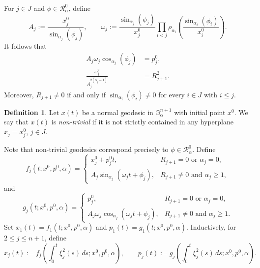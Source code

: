 \documentclass[12pt]{amsart}
\numberwithin{equation}{section}
\theoremstyle{plain}
\theoremstyle{definition}
\newtheorem{definition}[theorem]{Definition}%
\theoremstyle{remark}
\begin{document}
For \(j\in J\) and \(\phi\in\mathcal R_\alpha^0\), define
\begin{equation}\label{e.AandOmega}
    A_j
    :=
    \frac{x_j^0}{\sin_{\alpha_j}(\phi_j)},
    \qquad
    \omega_j
    :=
    \frac{\sin_{\alpha_j}(\phi_j)}{x_j^0}
    \prod_{i<j}
    \rho_{\alpha_i}
    \left(
    \frac{\sin_{\alpha_i}(\phi_i)}{x_i^0}
    \right).
\end{equation}
It follows that
\begin{align}
    A_j\omega_j\cos_{\alpha_j}(\phi_j)
     & =
    p_j^0,
    \label{properties}
    \\
    \frac{\omega_j^2}{A_j^{2(\alpha_j-1)}}
     & =
    R_{j+1}^2.
    \label{properties 2}
\end{align}
Moreover, \(R_{j+1}\neq 0\) if and only if
\(\sin_{\alpha_i}(\phi_i)\neq 0\) for every \(i\in J\) with \(i\leq j\).
\begin{definition}
    Let \(x(t)\) be a normal geodesic in \(\mathbb G_\alpha^{n+1}\) with initial point
    \(x^0\). We say that \(x(t)\) is \emph{non-trivial} if it is not strictly contained in any
    hyperplane \(x_j=x_j^0\), \(j\in J\).
\end{definition}
Note that
non-trivial geodesics correspond precisely to \(\phi\in\mathcal R_\alpha^0\). Define
\begin{equation}\label{x definition}
    f_j(t;x^0,p^0,\alpha)
    =
    \begin{cases}
        x_j^0+p_j^0t,
         & R_{j+1}=0 \text{ or } \alpha_j=0,          \\[2mm]
        A_j\sin_{\alpha_j}(\omega_jt+\phi_j),
         & R_{j+1}\neq 0 \text{ and } \alpha_j\geq 1,
    \end{cases}
\end{equation}
and
\begin{equation}\label{p definition}
    g_j(t;x^0,p^0,\alpha)
    =
    \begin{cases}
        p_j^0,
         & R_{j+1}=0 \text{ or } \alpha_j=0,          \\[2mm]
        A_j\omega_j\cos_{\alpha_j}(\omega_jt+\phi_j),
         & R_{j+1}\neq 0 \text{ and } \alpha_j\geq 1.
    \end{cases}
\end{equation}
Set \(x_1(t)=f_1(t;x^0,p^0,\alpha)\) and \(p_1(t)=g_1(t;x^0,p^0,\alpha)\). Inductively, for
\(2\leq j\leq n+1\), define
\begin{equation}\label{e.inductive-coordinates}
    x_j(t)
    :=
    f_j\left(\int_0^t \xi_j^2(s)\,ds;x^0,p^0,\alpha\right),
    \qquad
    p_j(t)
    :=
    g_j\left(\int_0^t \xi_j^2(s)\,ds;x^0,p^0,\alpha\right).
\end{equation}
\end{document}
